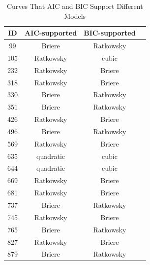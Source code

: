 \documentclass[11pt]{article}
\begin{document}
    \begin{table}[H]
      \centering
      \caption{Curves That AIC and BIC Support Different Models}
      \begin{tabular}{@{}cccc@{}}
        \toprule
        ID  & AIC-supported   & BIC-supported \\ \midrule
        99  & Briere    & Ratkowsky \\
        105 & Ratkowsky & cubic     \\
        232 & Ratkowsky & Briere              \\
        318 & Ratkowsky & Briere            \\
        330 & Briere    & Ratkowsky           \\
        351 & Briere    & Ratkowsky           \\
        426 & Ratkowsky & Briere             \\
        496 & Briere    & Ratkowsky          \\
        569 & Ratkowsky & Briere             \\
        635 & quadratic & cubic               \\
        644 & quadratic & cubic               \\
        669 & Ratkowsky & Briere             \\
        681 & Ratkowsky & Briere             \\
        737 & Briere    & Ratkowsky           \\
        745 & Ratkowsky & Briere             \\
        765 & Briere    & Ratkowsky           \\
        827 & Ratkowsky & Briere              \\
        879 & Briere    & Ratkowsky           \\ \bottomrule
        \end{tabular}
        \end{table}
\end{document}
